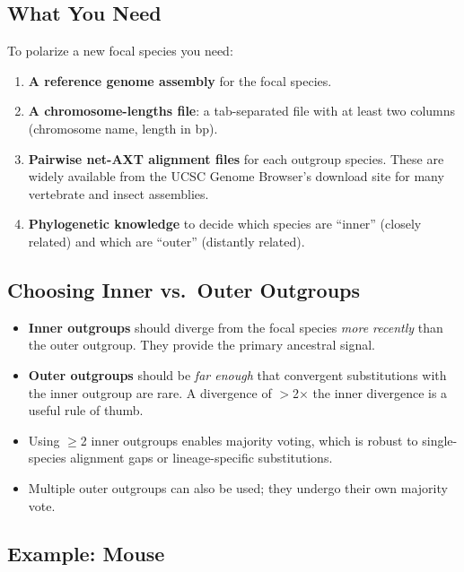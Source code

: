 \documentclass[11pt,a4paper]{article}
\begin{document}
\subsection{What You Need}

To polarize a new focal species you need:

\begin{enumerate}[leftmargin=2em]
    \item \textbf{A reference genome assembly} for the focal species.
    \item \textbf{A chromosome-lengths file}: a tab-separated file with at least two columns (chromosome name, length in bp).
    \item \textbf{Pairwise net-AXT alignment files} for each outgroup species.  These are widely available from the UCSC Genome Browser's download site for many vertebrate and insect assemblies.
    \item \textbf{Phylogenetic knowledge} to decide which species are ``inner'' (closely related) and which are ``outer'' (distantly related).
\end{enumerate}

\subsection{Choosing Inner vs.\ Outer Outgroups}

\begin{warningbox}
\begin{itemize}
    \item \textbf{Inner outgroups} should diverge from the focal species \emph{more recently} than the outer outgroup.  They provide the primary ancestral signal.
    \item \textbf{Outer outgroups} should be \emph{far enough} that convergent substitutions with the inner outgroup are rare.  A divergence of $>$2$\times$ the inner divergence is a useful rule of thumb.
    \item Using $\geq$2 inner outgroups enables majority voting, which is robust to single-species alignment gaps or lineage-specific substitutions.
    \item Multiple outer outgroups can also be used; they undergo their own majority vote.
\end{itemize}
\end{warningbox}

\subsection{Example: Mouse}
\end{document}
